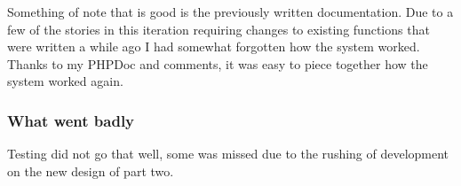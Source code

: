Something of note that is good is the previously written documentation. Due to a few of the stories in this iteration requiring changes to existing functions that were written a while ago I had somewhat forgotten how the system worked. Thanks to my PHPDoc and comments, it was easy to piece together how the system worked again.
\subsubsection{What went badly}
Testing did not go that well, some was missed due to the rushing of development on the new design of part two.
\newpage
